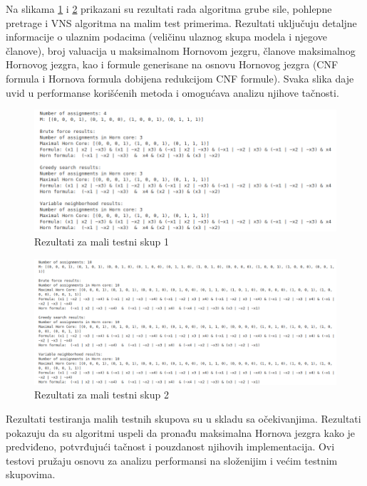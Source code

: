 \documentclass[12pt,oneside]{memoir}
\begin{document}
Na slikama \ref{fig:slika1} i \ref{fig:slika2} prikazani su rezultati rada algoritma grube sile, pohlepne pretrage i VNS algoritma na malim test primerima. Rezultati uključuju detaljne informacije o ulaznim podacima (veličinu ulaznog skupa modela i njegove članove), broj valuacija u maksimalnom Hornovom jezgru, članove maksimalnog Hornovog jezgra, kao i formule generisane na osnovu Hornovog jezgra (CNF formula i Hornova formula dobijena redukcijom CNF formule). Svaka slika daje uvid u performanse korišćenih metoda i omogućava analizu njihove tačnosti.

\begin{figure}[H]
    \centering
    \includegraphics[width=1\linewidth]{small_test_1.png}
    \caption{Rezultati za mali testni skup 1}
    \label{fig:slika1}
\end{figure}

\begin{figure}[H]
    \centering
    \includegraphics[width=1\linewidth]{small_test_2.png}
    \caption{Rezultati za mali testni skup 2}
    \label{fig:slika2}
\end{figure}

Rezultati testiranja malih testnih skupova su u skladu sa očekivanjima. Rezultati pokazuju da su algoritmi uspeli da pronađu maksimalna Hornova jezgra kako je predviđeno, potvrđujući tačnost i pouzdanost njihovih implementacija. Ovi testovi pružaju osnovu za analizu performansi na složenijim i većim testnim skupovima.
\end{document}
